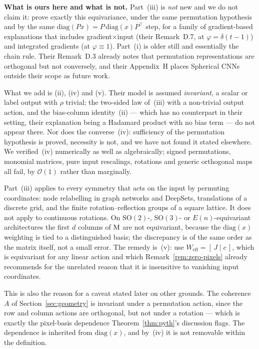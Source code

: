 \begin{clarifybox}
\textbf{What is ours here and what is not.} Part~(iii) is \emph{not} new and we
do not claim it: \citet[Prop.~D.6]{crabbe2023evaluating} prove exactly this
equivariance, under the same permutation hypothesis and by the same
$\mathrm{diag}(Px)=P\,\mathrm{diag}(x)P^{\top}$ step, for a family of
gradient-based explanations that includes gradient$\times$input
(their Remark~D.7, at $\varphi=\delta(t{-}1)$) and integrated gradients
(at $\varphi\equiv1$). Part~(i) is older still and essentially the chain rule.
Their Remark~D.3 already notes that permutation representations are orthogonal
but not conversely, and their Appendix~H places Spherical CNNs outside their
scope as future work.

What we add is (ii), (iv) and (v). Their model is assumed \emph{invariant}, a
scalar or label output with $\rho$ trivial; the two-sided law of~(iii) with a
non-trivial output action, and the bias-column identity~(ii) --- which has no
counterpart in their setting, their explanation being a Hadamard product with no
bias term --- do not appear there. Nor does the converse~(iv): sufficiency of
the permutation hypothesis is proved, necessity is not, and we have not found it
stated elsewhere. We verified~(iv) numerically as well as algebraically; signed
permutations, monomial matrices, pure input rescalings, rotations and generic
orthogonal maps all fail, by $\mathcal O(1)$ rather than marginally.
\end{clarifybox}

\begin{remark}
\label{rem:gdl-scope}
Part~(iii) applies to every symmetry that acts on the input by permuting
coordinates: node relabelling in graph networks and DeepSets,
translations of a discrete grid, and the finite rotation--reflection groups of a
square lattice. It does not apply to continuous rotations. On
$\mathrm{SO}(2)$-, $\mathrm{SO}(3)$- or $E(n)$-equivariant architectures the
first $d$ columns of $\mathrm{M}$ are not equivariant, because the $\mathrm{diag}(x)$
weighting is tied to a distinguished basis; the discrepancy is of the same order
as the matrix itself, not a small error. The remedy is~(v): use
$W_{\mathrm{eff}}=[\,J\mid c\,]$, which is equivariant for any linear action and
which Remark~\ref{rem:zero-pixels} already recommends for the unrelated reason
that it is insensitive to vanishing input coordinates.

This is also the reason for a caveat stated later on other grounds. The
coherence $A$ of Section~\ref{sec:geometry} is invariant under a permutation
action, since the row and column actions are orthogonal, but not under a
rotation --- which is exactly the pixel-basis dependence
Theorem~\ref{thm:pyth}'s discussion flags. The dependence is inherited from
$\mathrm{diag}(x)$, and by~(iv) it is not removable within the definition.
\end{remark}

